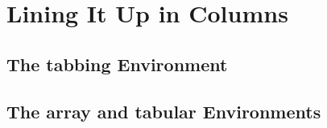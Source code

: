 \section{Lining It Up in Columns}
\subsection{The tabbing Environment}


\subsection{The array and tabular Environments}
\newpage